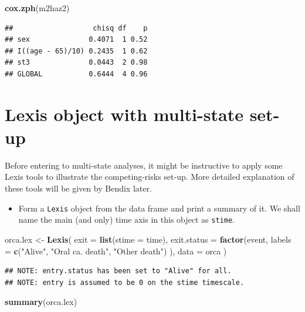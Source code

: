 \documentclass[
]{book}
\newenvironment{Shaded}{\begin{snugshade}}{\end{snugshade}}
\newcommand{\AttributeTok}[1]{\textcolor[rgb]{0.13,0.29,0.53}{#1}}
\newcommand{\FunctionTok}[1]{\textcolor[rgb]{0.13,0.29,0.53}{\textbf{#1}}}
\newcommand{\NormalTok}[1]{#1}
\newcommand{\OtherTok}[1]{\textcolor[rgb]{0.56,0.35,0.01}{#1}}
\newcommand{\StringTok}[1]{\textcolor[rgb]{0.31,0.60,0.02}{#1}}
\providecommand{\tightlist}{%
  \setlength{\itemsep}{0pt}\setlength{\parskip}{0pt}}
\begin{document}
\begin{Shaded}
\begin{Highlighting}[]
\FunctionTok{cox.zph}\NormalTok{(m2haz2)}
\end{Highlighting}
\end{Shaded}

\begin{verbatim}
##                   chisq df    p
## sex              0.4071  1 0.52
## I((age - 65)/10) 0.2435  1 0.62
## st3              0.0443  2 0.98
## GLOBAL           0.6444  4 0.96
\end{verbatim}

\section{Lexis object with multi-state set-up}\label{lexis-object-with-multi-state-set-up}

Before entering to multi-state analyses, it might be instructive to apply some Lexis tools to illustrate the competing-risks set-up.
More detailed explanation of these tools will be given by Bendix later.

\begin{itemize}
\tightlist
\item
  Form a \texttt{Lexis} object from the data frame and
  print a summary of it. We shall name the main (and only) time axis
  in this object as \texttt{stime}.
\end{itemize}

\begin{Shaded}
\begin{Highlighting}[]
\NormalTok{orca.lex }\OtherTok{\textless{}{-}} \FunctionTok{Lexis}\NormalTok{(}
  \AttributeTok{exit =} \FunctionTok{list}\NormalTok{(}\AttributeTok{stime =}\NormalTok{ time),}
  \AttributeTok{exit.status =} \FunctionTok{factor}\NormalTok{(event,}
    \AttributeTok{labels =} \FunctionTok{c}\NormalTok{(}\StringTok{"Alive"}\NormalTok{, }\StringTok{"Oral ca. death"}\NormalTok{, }\StringTok{"Other death"}\NormalTok{)}
\NormalTok{  ),}
  \AttributeTok{data =}\NormalTok{ orca}
\NormalTok{)}
\end{Highlighting}
\end{Shaded}

\begin{verbatim}
## NOTE: entry.status has been set to "Alive" for all.
## NOTE: entry is assumed to be 0 on the stime timescale.
\end{verbatim}

\begin{Shaded}
\begin{Highlighting}[]
\FunctionTok{summary}\NormalTok{(orca.lex)}
\end{Highlighting}
\end{Shaded}
\end{document}
